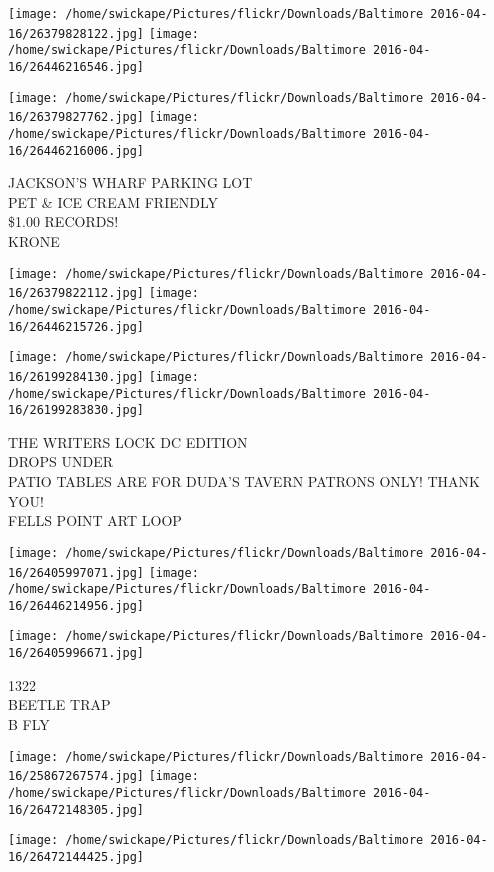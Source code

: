 \documentclass[10pt,letterpaper]{article}
\begin{document}
\texttt{[image: /home/swickape/Pictures/flickr/Downloads/Baltimore 2016-04-16/26379828122.jpg]}
\texttt{[image: /home/swickape/Pictures/flickr/Downloads/Baltimore 2016-04-16/26446216546.jpg]}

\texttt{[image: /home/swickape/Pictures/flickr/Downloads/Baltimore 2016-04-16/26379827762.jpg]}
\texttt{[image: /home/swickape/Pictures/flickr/Downloads/Baltimore 2016-04-16/26446216006.jpg]}

JACKSON'S WHARF PARKING LOT\\
PET \& ICE CREAM FRIENDLY\\
\$1.00 RECORDS!\\
KRONE
\pagebreak

\texttt{[image: /home/swickape/Pictures/flickr/Downloads/Baltimore 2016-04-16/26379822112.jpg]}
\texttt{[image: /home/swickape/Pictures/flickr/Downloads/Baltimore 2016-04-16/26446215726.jpg]}

\texttt{[image: /home/swickape/Pictures/flickr/Downloads/Baltimore 2016-04-16/26199284130.jpg]}
\texttt{[image: /home/swickape/Pictures/flickr/Downloads/Baltimore 2016-04-16/26199283830.jpg]}

THE WRITERS LOCK DC EDITION\\
DROPS UNDER\\
PATIO TABLES ARE FOR DUDA'S TAVERN PATRONS ONLY!  THANK YOU!\\
FELLS POINT ART LOOP
\pagebreak

\texttt{[image: /home/swickape/Pictures/flickr/Downloads/Baltimore 2016-04-16/26405997071.jpg]}
\texttt{[image: /home/swickape/Pictures/flickr/Downloads/Baltimore 2016-04-16/26446214956.jpg]}

\vspace{0.25in}
\texttt{[image: /home/swickape/Pictures/flickr/Downloads/Baltimore 2016-04-16/26405996671.jpg]}

1322\\
BEETLE TRAP\\
B FLY
\pagebreak

\texttt{[image: /home/swickape/Pictures/flickr/Downloads/Baltimore 2016-04-16/25867267574.jpg]}
\texttt{[image: /home/swickape/Pictures/flickr/Downloads/Baltimore 2016-04-16/26472148305.jpg]}

\texttt{[image: /home/swickape/Pictures/flickr/Downloads/Baltimore 2016-04-16/26472144425.jpg]}
\end{document}
